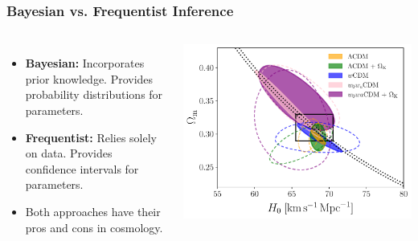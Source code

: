 \documentclass[aspectratio=169]{beamer}
\begin{document}
\begin{frame}
    \frametitle{Bayesian vs. Frequentist Inference}
    \begin{columns}
        \begin{itemize}
            \item \textbf{Bayesian:}  Incorporates prior knowledge.  Provides probability distributions for parameters.
            \item \textbf{Frequentist:} Relies solely on data.  Provides confidence intervals for parameters.
            \item Both approaches have their pros and cons in cosmology.
        \end{itemize}
        \includegraphics[width=\textwidth]{figures/BAO_CosmoVerse_fig_3a_final_rectangle.pdf}
    \end{columns}
\end{frame}
\end{document}
